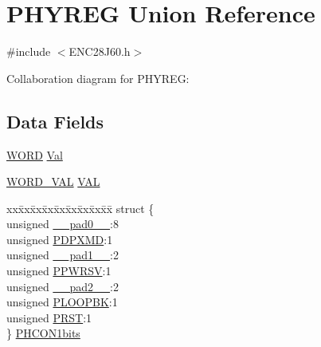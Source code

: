 \hypertarget{union_p_h_y_r_e_g}{}\section{P\+H\+Y\+R\+E\+G Union Reference}
\label{union_p_h_y_r_e_g}


{\ttfamily \#include $<$E\+N\+C28\+J60.\+h$>$}



Collaboration diagram for P\+H\+Y\+R\+E\+G\+:
\subsection*{Data Fields}
\begin{DoxyCompactItemize}
\item 
\hyperlink{_generic_type_defs_8h_a2b0e863dadf920709ec53d9088ee7c91}{W\+O\+R\+D} \hyperlink{union_p_h_y_r_e_g_aa498550e7f87da9a38dc71609652e6bd}{Val}
\item 
\hyperlink{union_w_o_r_d___v_a_l}{W\+O\+R\+D\+\_\+\+V\+A\+L} \hyperlink{union_p_h_y_r_e_g_abe45eb6b11b30b993f8029a7048239a2}{V\+A\+L}
\item 
\begin{tabbing}
xx\=xx\=xx\=xx\=xx\=xx\=xx\=xx\=xx\=\kill
struct \{\\
\>unsigned \hyperlink{union_p_h_y_r_e_g_adf71f3d8410c1f1dbbc96680a92c49af}{\_\_pad0\_\_}:8\\
\>unsigned \hyperlink{union_p_h_y_r_e_g_a2e0978ce52433ab2192b913a8aea44ff}{PDPXMD}:1\\
\>unsigned \hyperlink{union_p_h_y_r_e_g_acaf2d0924a107ec6e8d2e31febaf66f9}{\_\_pad1\_\_}:2\\
\>unsigned \hyperlink{union_p_h_y_r_e_g_ae7c15f2966e7ea51ac4c408049bb6f78}{PPWRSV}:1\\
\>unsigned \hyperlink{union_p_h_y_r_e_g_a4d97cc5f7d51d22fc2bf3eab35c9cb7f}{\_\_pad2\_\_}:2\\
\>unsigned \hyperlink{union_p_h_y_r_e_g_a0ee2cc01c3ca689388540be3f16a614a}{PLOOPBK}:1\\
\>unsigned \hyperlink{union_p_h_y_r_e_g_a56fcdc1e161680b29cbd3b57d2c15a3c}{PRST}:1\\
\} \hyperlink{union_p_h_y_r_e_g_af2baf4360a5caa161520004ca3862df1}{PHCON1bits}\\


\end{tabbing}
\end{DoxyCompactItemize}

